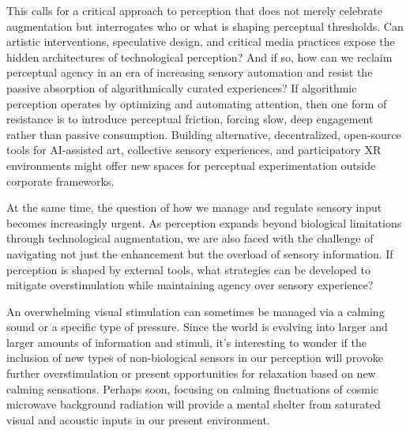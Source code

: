 This calls for a critical approach to perception that does not merely celebrate augmentation but interrogates who or what is shaping perceptual thresholds. Can artistic interventions, speculative design, and critical media practices expose the hidden architectures of technological perception? And if so, how can we reclaim perceptual agency in an era of increasing sensory automation and resist the passive absorption of algorithmically curated experiences? If algorithmic perception operates by optimizing and automating attention, then one form of resistance is to introduce perceptual friction, forcing slow, deep engagement rather than passive consumption. Building alternative, decentralized, open-source tools for AI-assisted art, collective sensory experiences, and participatory XR environments might offer new spaces for perceptual experimentation outside corporate frameworks.

At the same time, the question of how we manage and regulate sensory input becomes increasingly urgent. As perception expands beyond biological limitations through technological augmentation, we are also faced with the challenge of navigating not just the enhancement but the overload of sensory information. If perception is shaped by external tools, what strategies can be developed to mitigate overstimulation while maintaining agency over sensory experience?

An overwhelming visual stimulation can sometimes be managed via a calming sound or a specific type of pressure. Since the world is evolving into larger and larger amounts of information and stimuli, it's interesting to wonder if the inclusion of new types of non-biological sensors in our perception will provoke further overstimulation or present opportunities for relaxation based on new calming sensations. Perhaps soon, focusing on calming fluctuations of cosmic microwave background radiation will provide a mental shelter from saturated visual and acoustic inputs in our present environment.




